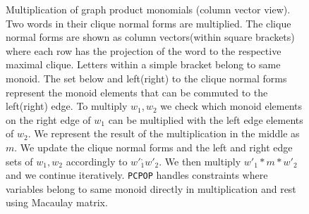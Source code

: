 \begin{example}
\begin{figure}[H]
\caption{Multiplication of graph product monomials (column vector view). Two words in their clique normal forms are multiplied. The clique normal forms are shown as column vectors(within square brackets) where each row has the projection of the word to the respective maximal clique. Letters within a simple bracket belong to same monoid. The set below and left(right) to the clique normal forms represent the monoid elements that can be commuted to the left(right) edge. To multiply $w_1,w_2$ we check which monoid elements on the right edge of $w_1$ can be multiplied with the left edge elements of $w_2$. We represent the result of the multiplication in the middle as $m$. We update the clique normal forms and the left and right edge sets of $w_1,w_2$ accordingly to ${w'}_1^,{w'}_2$. We then multiply ${w'}_1*m*{w'}_2$ and we continue iteratively. \texttt{PCPOP} handles constraints where variables belong to same monoid directly in multiplication and rest using Macaulay matrix.}
\end{figure}  


\end{example}